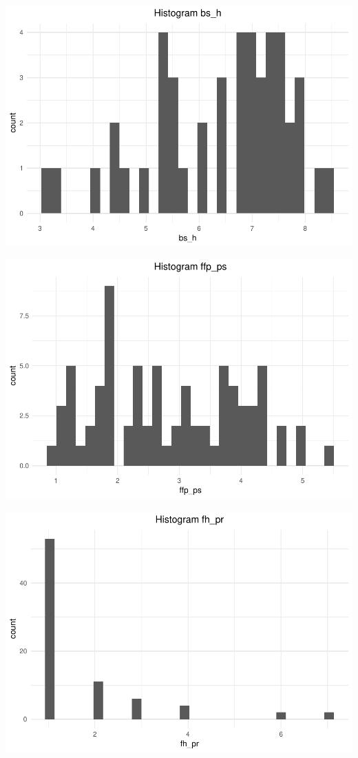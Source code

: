 \documentclass[]{elsarticle} %
\makeatletter
\def\maxwidth{\ifdim\Gin@nat@width>\linewidth\linewidth
\else\Gin@nat@width\fi}
\let\Oldincludegraphics\includegraphics
\renewcommand{\includegraphics}[1]{\Oldincludegraphics[width=\maxwidth]{#1}}
\makeatother
\begin{document}
\includegraphics{stephanie-moura-rmarkdown-tf-ad-ufpe-2018_files/figure-latex/ggplot_variables2-1.pdf}

\includegraphics{stephanie-moura-rmarkdown-tf-ad-ufpe-2018_files/figure-latex/ggplot_variables3-1.pdf}

\includegraphics{stephanie-moura-rmarkdown-tf-ad-ufpe-2018_files/figure-latex/ggplot_variables4-1.pdf}
\end{document}

